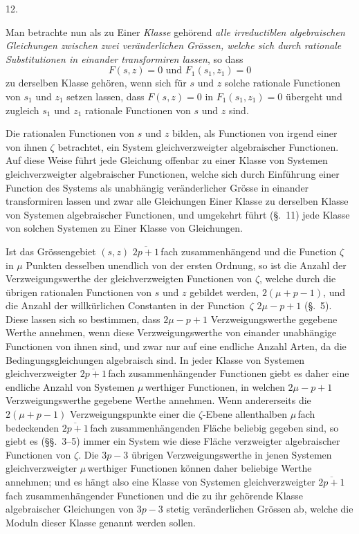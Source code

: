 \documentclass[a4paper,12pt,leqno]{article}
\begin{document}
\medbreak

\centerline{12.}

\nobreak\medskip

Man betrachte nun als zu Einer \emph{Klasse} geh\"{o}rend
\emph{alle irreductiblen algebraischen Gleichungen zwischen zwei
ver\"{a}nderlichen Gr\"{o}ssen, welche sich durch rationale
Substitutionen in einander transformiren lassen}, so dass
\[ F(s,z) = 0 \mbox{ und } F_1(s_1, z_1) = 0 \]
zu derselben Klasse geh\"{o}ren, wenn sich f\"{u}r $s$ und $z$
solche rationale Functionen von $s_1$ und $z_1$ setzen lassen,
dass $F(s,z) = 0$ in $F_1(s_1, z_1) = 0$ \"{u}bergeht und
zugleich $s_1$ und $z_1$ rationale Functionen von $s$ und $z$
sind.

Die rationalen Functionen von $s$ und $z$ bilden, als Functionen
von irgend einer von ihnen $\zeta$ betrachtet, ein System
gleichverzweigter algebraischer Functionen.  Auf diese Weise
f\"{u}hrt jede Gleichung offenbar zu einer Klasse von Systemen
gleichverzweigter algebraischer Functionen, welche sich durch
Einf\"{u}hrung einer Function des Systems als unabh\"{a}ngig
ver\"{a}nderlicher Gr\"{o}sse in einander transformiren lassen
und zwar alle Gleichungen Einer Klasse zu derselben Klasse von
Systemen algebraischer Functionen, und umgekehrt f\"{u}hrt
(\S.~11) jede Klasse von solchen Systemen zu Einer Klasse von
Gleichungen.

Ist das Gr\"{o}ssengebiet $(s,z)$ $\overline{2p + 1} \,$\-fach
zusammenh\"{a}ngend und die Function $\zeta$ in $\mu$ Punkten
desselben unendlich von der ersten Ordnung, so ist die Anzahl der
Verzweigungswerthe der gleichverzweigten Functionen von $\zeta$,
welche durch die \"{u}brigen rationalen Functionen von $s$ und
$z$ gebildet werden, $2(\mu + p - 1)$, und die Anzahl der
willk\"{u}rlichen Constanten in der Function~$\zeta$
$2\mu - p + 1$ (\S.~5).  Diese lassen sich so bestimmen, dass
$2\mu - p + 1$ Verzweigungswerthe gegebene Werthe annehmen, wenn
diese Verzweigungswerthe von einander unabh\"{a}ngige Functionen
von ihnen sind, und zwar nur auf eine endliche Anzahl Arten, da
die Bedingungsgleichungen algebraisch sind.  In jeder Klasse von
Systemen gleichverzweigter $\overline{2p + 1} \,$\-fach
zusammenh\"{a}ngender Functionen giebt es daher eine endliche
Anzahl von Systemen $\mu \,$\-werthiger Functionen, in welchen
$2\mu - p + 1$ Verzweigungswerthe gegebene Werthe annehmen.  Wenn
andererseits die $2(\mu + p - 1)$ Verzweigungspunkte einer die
$\zeta$-Ebene allenthalben $\mu \,$\-fach bedeckenden
$\overline{2p + 1} \,$\-fach zusammenh\"{a}ngenden Fl\"{a}che beliebig
gegeben sind, so giebt es (\S\S.~3--5) immer ein System wie diese
Fl\"{a}che verzweigter algebraischer Functionen von $\zeta$.  Die
$3p - 3$ \"{u}brigen Verzweigungswerthe in jenen Systemen
gleichverzweigter $\mu \,$\-werthiger Functionen k\"{o}nnen daher
beliebige Werthe annehmen; und es h\"{a}ngt also eine Klasse von
Systemen gleichverzweigter $\overline{2p + 1} \,$\-fach
zusammenh\"{a}ngender Functionen und die zu ihr geh\"{o}rende
Klasse algebraischer Gleichungen von $3p - 3$ stetig
ver\"{a}nderlichen Gr\"{o}ssen ab, welche die Moduln dieser
Klasse genannt werden sollen.
\end{document}
